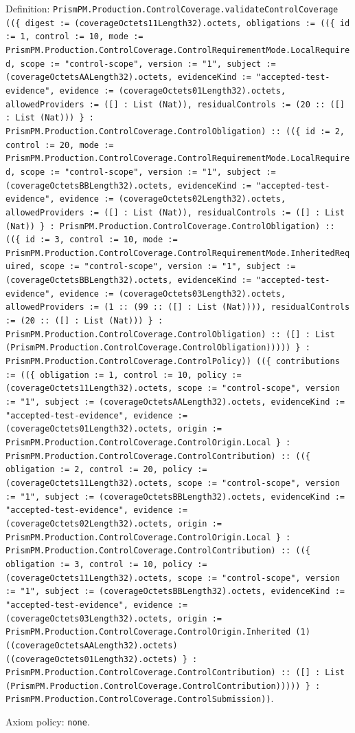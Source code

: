 \documentclass[11pt]{article}
\begin{document}
\noindent Definition: \texttt{PrismPM.Production.ControlCoverage.validateControlCoverage ((\{ digest := (coverageOctets11Length32).octets, obligations := ((\{ id := 1, control := 10, mode := PrismPM.Production.ControlCoverage.ControlRequirementMode.LocalRequired, scope := "control-scope", version := "1", subject := (coverageOctetsAALength32).octets, evidenceKind := "accepted-test-evidence", evidence := (coverageOctets01Length32).octets, allowedProviders := ([] : List (Nat)), residualControls := (20 :: ([] : List (Nat))) \} : PrismPM.Production.ControlCoverage.ControlObligation) :: ((\{ id := 2, control := 20, mode := PrismPM.Production.ControlCoverage.ControlRequirementMode.LocalRequired, scope := "control-scope", version := "1", subject := (coverageOctetsBBLength32).octets, evidenceKind := "accepted-test-evidence", evidence := (coverageOctets02Length32).octets, allowedProviders := ([] : List (Nat)), residualControls := ([] : List (Nat)) \} : PrismPM.Production.ControlCoverage.ControlObligation) :: ((\{ id := 3, control := 10, mode := PrismPM.Production.ControlCoverage.ControlRequirementMode.InheritedRequired, scope := "control-scope", version := "1", subject := (coverageOctetsBBLength32).octets, evidenceKind := "accepted-test-evidence", evidence := (coverageOctets03Length32).octets, allowedProviders := (1 :: (99 :: ([] : List (Nat)))), residualControls := (20 :: ([] : List (Nat))) \} : PrismPM.Production.ControlCoverage.ControlObligation) :: ([] : List (PrismPM.Production.ControlCoverage.ControlObligation))))) \} : PrismPM.Production.ControlCoverage.ControlPolicy)) ((\{ contributions := ((\{ obligation := 1, control := 10, policy := (coverageOctets11Length32).octets, scope := "control-scope", version := "1", subject := (coverageOctetsAALength32).octets, evidenceKind := "accepted-test-evidence", evidence := (coverageOctets01Length32).octets, origin := PrismPM.Production.ControlCoverage.ControlOrigin.Local \} : PrismPM.Production.ControlCoverage.ControlContribution) :: ((\{ obligation := 2, control := 20, policy := (coverageOctets11Length32).octets, scope := "control-scope", version := "1", subject := (coverageOctetsBBLength32).octets, evidenceKind := "accepted-test-evidence", evidence := (coverageOctets02Length32).octets, origin := PrismPM.Production.ControlCoverage.ControlOrigin.Local \} : PrismPM.Production.ControlCoverage.ControlContribution) :: ((\{ obligation := 3, control := 10, policy := (coverageOctets11Length32).octets, scope := "control-scope", version := "1", subject := (coverageOctetsBBLength32).octets, evidenceKind := "accepted-test-evidence", evidence := (coverageOctets03Length32).octets, origin := PrismPM.Production.ControlCoverage.ControlOrigin.Inherited (1) ((coverageOctetsAALength32).octets) ((coverageOctets01Length32).octets) \} : PrismPM.Production.ControlCoverage.ControlContribution) :: ([] : List (PrismPM.Production.ControlCoverage.ControlContribution))))) \} : PrismPM.Production.ControlCoverage.ControlSubmission))}.\par
\noindent Axiom policy: \texttt{none}.\par
\end{document}
